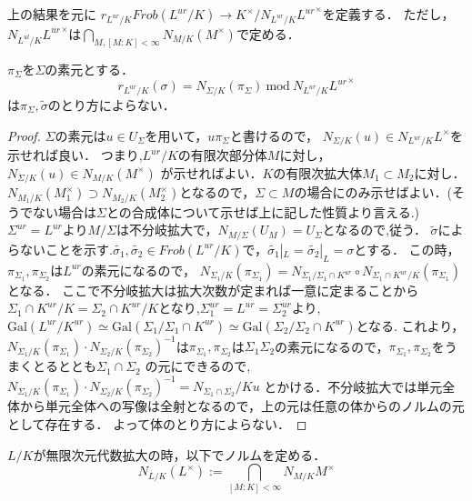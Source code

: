 \documentclass{ujarticle}
\begin{document}
上の結果を元に
$r_{L^{ur}/K}Frob(L^{ur}/K) \to K^{\times}/N_{L^{ur}/K}{L^{ur}}^{\times}$を定義する．
ただし，$N_{L^{ul}/K}{L^{ur}}^{\times}$は$\displaystyle \bigcap_{M,[M:K]< \infty}N_{M/K}(M^{\times})$で定める．
\begin{lem}
$\pi_{\Sigma}$を$\Sigma$の素元とする．
 \begin{equation*}
  r_{L^{ur}/K}(\sigma)=N_{\Sigma/K}(\pi_{\Sigma})\ \mbox{mod}\ N_{L^{ur}/K}{L^{ur}}^{\times}
 \end{equation*}
は$\pi_{\Sigma},\tilde{\sigma}$のとり方によらない．
\end{lem}
\begin{proof}
$\Sigma$の素元は$u \in U_{\Sigma}$を用いて，$u \pi_{\Sigma}$と書けるので，
$N_{\Sigma/K}(u) \in N_{L^{ur}/K}L^{\times}$を示せれば良い．
つまり,$L^{ur}/K$の有限次部分体$M$に対し，$N_{\Sigma/K}(u) \in N_{M/K}(M^{\times})$
が示せればよい．$K$の有限次拡大体$M_1\subset M_2$に対し．$N_{M_1/K}(M_1^{\times}) \supset N_{M_2/K}(M_2^{\times})$となるので，$\Sigma \subset M$の場合にのみ示せばよい．(そうでない場合は$\Sigma$との合成体について示せば上に記した性質より言える.)
$\Sigma^{ur}=L^{ur}$より$M/\Sigma$は不分岐拡大で，$N_{M/\Sigma}(U_M)=U_{\Sigma}$となるので,従う．
$\tilde{\sigma}$によらないことを示す.$\tilde{\sigma_1},\tilde{\sigma_2} \in Frob(L^{ur}/K)$で，$\tilde{\sigma_1}|_L=\tilde{\sigma_2}|_L=\sigma$とする．
この時，$\pi_{\Sigma_1},\pi_{\Sigma_2}$は$L^{ur}$の素元になるので，
$N_{\Sigma_1/K}(\pi_{\Sigma_1})=N_{\Sigma_1/\Sigma_1\cap K^{ur}} \circ N_{\Sigma_1\cap K^{ur}/K}(\pi_{\Sigma_1}) $
となる．
ここで不分岐拡大は拡大次数が定まれば一意に定まることから
$\Sigma_1\cap K^{ur}/K = \Sigma_2\cap K^{ur}/K$となり,$\Sigma_1^{ur}=L^{ur}=\Sigma_2^{ur}$より,
$\mathrm{Gal}(L^{ur}/K^{ur}) \simeq \mathrm{Gal}(\Sigma_1/\Sigma_1 \cap K^{ur}) \simeq \mathrm{Gal}(\Sigma_2/\Sigma_2 \cap K^{ur})$となる.
これより，$N_{\Sigma_1/K}(\pi_{\Sigma_1}) \cdot {N_{\Sigma_2/K}(\pi_{\Sigma_2})}^{-1}$は$\pi_{\Sigma_1},\pi_{\Sigma_2}$は$\Sigma_1 \Sigma_2$の素元になるので，$\pi_{\Sigma_1},\pi_{\Sigma_2}$をうまくとるととも$\Sigma_1  \cap \Sigma_2$
の元にできるので,$N_{\Sigma_1/K}(\pi_{\Sigma_1}) \cdot {N_{\Sigma_2/K}(\pi_{\Sigma_2})}^{-1}= N_{\Sigma_1 \cap \Sigma_2}/K u$
とかける．不分岐拡大では単元全体から単元全体への写像は全射となるので，上の元は任意の体からのノルムの元として存在する．
よって体のとり方によらない．
\end{proof}

$L/K$が無限次元代数拡大の時，以下でノルムを定める．
\begin{equation*}
  N_{L/K}(L^{\times}):=\bigcap_{[M:K] < \infty} N_{M/K}M^{\times}
\end{equation*}
\end{document}
